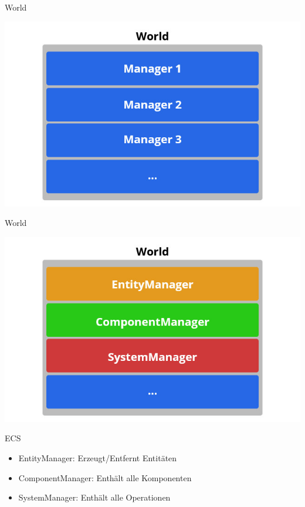 \documentclass{presentation}
\begin{document}
\begin{frame}{World}
    \begin{center}
        \includegraphics[width=\textwidth]{world_structure_general.jpg}
    \end{center}
\end{frame}

\begin{frame}{World}
    \begin{center}
        \includegraphics[width=\textwidth]{world_structure_specific.jpg}
    \end{center}
\end{frame}

\begin{frame}{ECS}
    \begin{itemize}
        \item EntityManager: Erzeugt/Entfernt Entitäten
        \item ComponentManager: Enthält alle Komponenten
        \item SystemManager: Enthält alle Operationen
    \end{itemize}
\end{frame}
\end{document}
